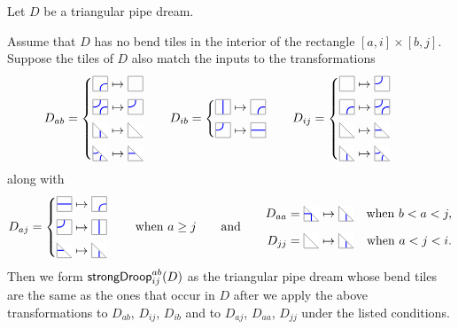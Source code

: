 \documentclass[10pt]{article}
\begin{document}
\begin{definition}
\label{extended-droop-def}
Let $D$ be a triangular pipe dream.
\ben
\item[(a)] Assume
that $D$ has no bend tiles in the interior of the
rectangle $[a,i]\times[b,j]$.
Suppose the
 tiles of $D$
 also match the inputs to the transformations
\[
\ba
D_{ab} &= \begin{cases}
\CTILE \mapsto \BTILE \\[-10pt]\\
\ETILE \mapsto \JTILE  \\[-10pt]\\
\CDIAG  \mapsto \BDIAG  \\[-10pt]\\
\EDIAG \mapsto \JDIAG
\end{cases}
&
D_{ib} &=\begin{cases}
\VTILE \mapsto \CTILE \\[-10pt]\\
\JTILE  \mapsto \HTILE
\end{cases}
&
D_{ij} &= \begin{cases}
\BTILE \mapsto \JTILE \\[-10pt]\\
\CTILE  \mapsto \ETILE  \\[-10pt]\\
\BDIAG \mapsto \JDIAG \\[-10pt]\\
\CDIAG \mapsto \EDIAG 
\end{cases}
\ea
\]
along with
\[
D_{aj} = \begin{cases}
\HTILE \mapsto \CTILE \\[-10pt]\\
\JTILE  \mapsto \VTILE\\[-10pt]\\
\JDIAG \mapsto \CDIAG
\end{cases}
\quad\text{when }a\geq  j
\qquand
\ba 
D_{aa} &= 
\PDIAG \mapsto \CDIAG
&\text{when }b<a< j,
\\[-10pt]\\
D_{jj} &=
\BDIAG \mapsto  \CDIAG 
&\text{when }a<j<i.
\ea
\]
Then we form $\mathsf{strongDroop}^{ab}_{ij}(D)$
as the triangular pipe dream whose bend tiles are the same as the ones 
that occur in $D$ after we apply the above transformations
to $D_{ab}$, $D_{ij}$, $D_{ib}$ and to
 $D_{aj}$, $D_{aa}$, $D_{jj}$ under the listed conditions.



\end{definition}
\end{document}
